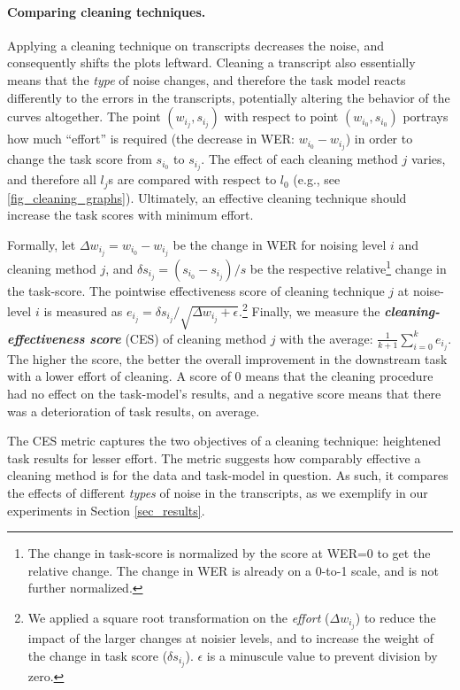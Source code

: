 

\paragraph{Comparing cleaning techniques.}
Applying a cleaning technique on transcripts decreases the noise, and consequently shifts the plots leftward. Cleaning a transcript also essentially means that the \textit{type} of noise changes, and therefore the task model reacts differently to the errors in the transcripts, potentially altering the behavior of the curves altogether.
The point $(w_{i_j}, s_{i_j})$ with respect to point $(w_{i_0}, s_{i_0})$ portrays how much ``effort'' is required (the decrease in WER: $w_{i_0} - w_{i_j}$) in order to change the task score from $s_{i_0}$ to $s_{i_j}$. The effect of each cleaning method $j$ varies, and therefore all $l_j$s are compared with respect to $l_0$ (e.g., see \autoref{fig_cleaning_graphs}). Ultimately, an effective cleaning technique should increase the task scores with minimum effort.

Formally, let $\Delta w_{i_j} = w_{i_0} - w_{i_j}$ be the change in WER for noising level $i$ and cleaning method $j$, and $\delta s_{i_j} = (s_{i_0} - s_{i_j}) / s$ be the respective relative\footnote{The change in task-score is normalized by the score at WER=0 to get the relative change. The change in WER is already on a 0-to-1 scale, and is not further normalized.} change in the task-score. The pointwise effectiveness score of cleaning technique $j$ at noise-level $i$ is measured as $e_{i_j} = \delta s_{i_j} / \sqrt{\Delta w_{i_j} + \epsilon}$.\footnote{We applied a square root transformation on the \textit{effort} ($\Delta w_{i_j}$) to reduce the impact of the larger changes at noisier levels, and to increase the weight of the change in task score ($\delta s_{i_j}$). $\epsilon$ is a minuscule value to prevent division by zero.} Finally, we measure the \textit{\textbf{cleaning-effectiveness score}} (CES) of cleaning method $j$ with the average: $\frac{1}{k+1} \sum_{i=0}^k e_{i_j}$. The higher the score, the better the overall improvement in the downstream task with a lower effort of cleaning. A score of 0 means that the cleaning procedure had no effect on the task-model's results, and a negative score means that there was a deterioration of task results, on average. 

The CES metric captures the two objectives of a cleaning technique: heightened task results for lesser effort.
The metric suggests how comparably effective a cleaning method is for the data and task-model in question. As such, it compares the effects of different \textit{types} of noise in the transcripts, as we exemplify in our experiments in Section \ref{sec_results}.




